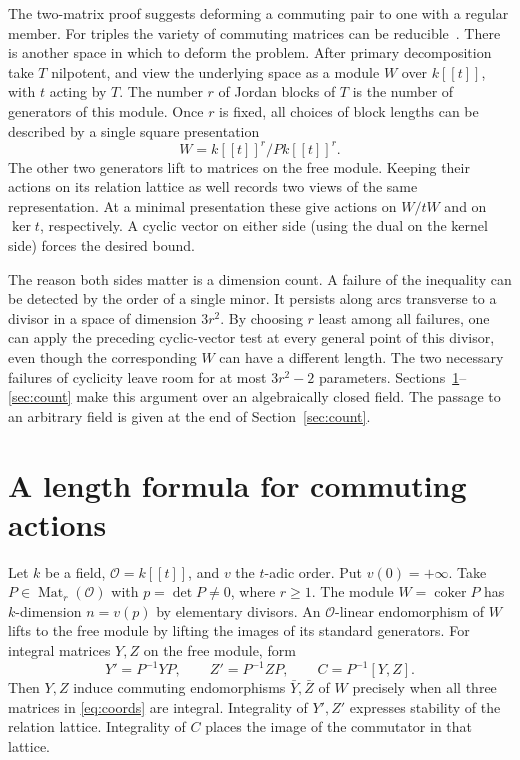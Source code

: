 \documentclass[11pt,reqno]{amsart}
\theoremstyle{definition}
\newcommand{\Mat}{\operatorname{Mat}}
\newcommand{\coker}{\operatorname{coker}}
\newcommand{\OO}{\mathcal O}
\begin{document}
The two-matrix proof suggests deforming a commuting pair to one with a
regular member. For triples the variety of commuting matrices can be
reducible~\cite{Gur}. There is another space in which to deform the
problem. After primary decomposition take \(T\) nilpotent, and view the
underlying space as a module \(W\) over \(k[[t]]\), with \(t\) acting by
\(T\). The number \(r\) of Jordan blocks of \(T\) is the number of
generators of this module. Once \(r\) is fixed, all choices of block
lengths can be described by a single square presentation
\[
                        W=k[[t]]^r/Pk[[t]]^r.
\]
The other two generators lift to matrices on the free module. Keeping
their actions on its relation lattice as well records two views of the
same representation. At a minimal presentation these give actions on
\(W/tW\) and on \(\ker t\), respectively. A cyclic vector on either
side (using the dual on the kernel side) forces the desired bound.

The reason both sides matter is a dimension count. A failure of the
inequality can be detected by the order of a single minor. It persists
along arcs transverse to a divisor in a space of dimension \(3r^2\).
By choosing \(r\) least among all failures, one can apply the preceding
cyclic-vector test at every general point of this divisor, even though
the corresponding \(W\) can have a different length. The two necessary
failures of cyclicity leave room for at most \(3r^2-2\) parameters.
Sections~\ref{sec:lattice}--\ref{sec:count} make this argument over an
algebraically closed field. The passage to an arbitrary field is given
at the end of Section~\ref{sec:count}.

\section{A length formula for commuting actions}\label{sec:lattice}
Let \(k\) be a field, \(\OO=k[[t]]\), and \(v\) the \(t\)-adic order.
Put \(v(0)=+\infty\). Take \(P\in\Mat_r(\OO)\) with \(p=\det P\ne0\),
where \(r\geq1\). The module \(W=\coker P\) has \(k\)-dimension
\(n=v(p)\) by elementary divisors. An \(\OO\)-linear endomorphism of
\(W\) lifts to the free module by lifting the images of its standard
generators. For integral matrices \(Y,Z\) on the free module, form
\begin{equation}\label{eq:coords}
         Y'=P^{-1}YP,\qquad Z'=P^{-1}ZP,\qquad C=P^{-1}[Y,Z].
\end{equation}
Then \(Y,Z\) induce commuting endomorphisms \(\bar Y,\bar Z\) of \(W\)
precisely when all three matrices in \eqref{eq:coords} are integral.
Integrality of \(Y',Z'\) expresses stability of the relation lattice.
Integrality of \(C\) places the image of the commutator in that lattice.
\end{document}
